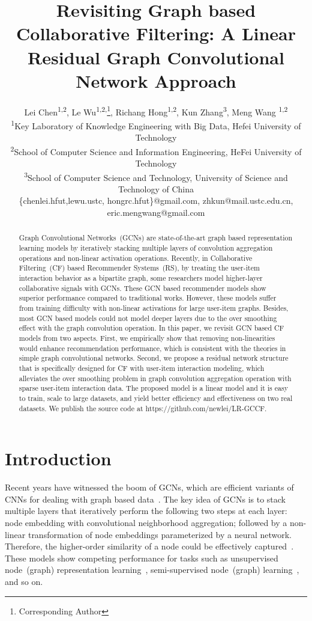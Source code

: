 \documentclass[letterpaper]{article} %
\title{Revisiting Graph based Collaborative Filtering: A Linear Residual Graph Convolutional Network Approach}
\author {
Lei Chen\textsuperscript{\rm 1,2},
Le Wu\textsuperscript{\rm 1,2,}\thanks{Corresponding Author},
Richang Hong\textsuperscript{\rm 1,2},
Kun Zhang\textsuperscript{\rm 3},
Meng Wang \textsuperscript{\rm 1,2} \\
\textsuperscript{\rm 1}Key Laboratory of Knowledge Engineering with Big Data, Hefei University of Technology \\
\textsuperscript{\rm 2}School of Computer Science and Information Engineering, HeFei University of Technology \\
\textsuperscript{\rm 3}School of Computer Science and Technology, University of Science and Technology of China\\
\{chenlei.hfut,lewu.ustc, hongrc.hfut\}@gmail.com,
zhkun@mail.ustc.edu.cn,
eric.mengwang@gmail.com
}
\begin{document}
\maketitle

\begin{abstract}


Graph Convolutional Networks~(GCNs) are state-of-the-art graph based representation learning models by iteratively stacking multiple layers of convolution aggregation operations and non-linear activation operations. Recently, in Collaborative Filtering~(CF) based Recommender Systems~(RS), by treating the user-item interaction behavior as a bipartite graph, some researchers model higher-layer collaborative signals with GCNs. These GCN based recommender models show superior performance compared to traditional works. However, these models suffer from training difficulty with non-linear activations for large user-item graphs. Besides, most GCN based models could not model deeper layers due to the over smoothing effect with  the graph convolution operation. In this paper, we revisit GCN based CF models from two aspects.  First, we empirically show that removing non-linearities would enhance recommendation performance, which is consistent with the theories in simple graph convolutional networks. Second, we propose a residual network structure that is specifically designed for CF with user-item interaction modeling, which alleviates the over smoothing problem in graph convolution aggregation operation with sparse user-item interaction data. The proposed model is a linear model and it is easy to train, scale to large datasets, and yield better efficiency and effectiveness on two real datasets. We publish the source code at https://github.com/newlei/LR-GCCF.



\end{abstract}



\section{Introduction}


Recent years have witnessed the boom of GCNs, which are efficient variants of CNNs for dealing with graph based data~\cite{ICLR2017semi,NIPS2017inductive}. The key idea of GCNs is to stack multiple layers that iteratively perform the following two steps at each layer: node embedding with convolutional neighborhood aggregation; followed by a non-linear transformation of node embeddings parameterized by a neural network. Therefore, the higher-order similarity of a node could be effectively captured~\cite{ICLR2019powerful,li2018deeper}. These models show competing performance for tasks such as unsupervised node~(graph) representation learning~\cite{li2016unsupervised}, semi-supervised node~(graph) learning~\cite{ICLR2017semi,camps2007semi}, and so on.
\end{document}
